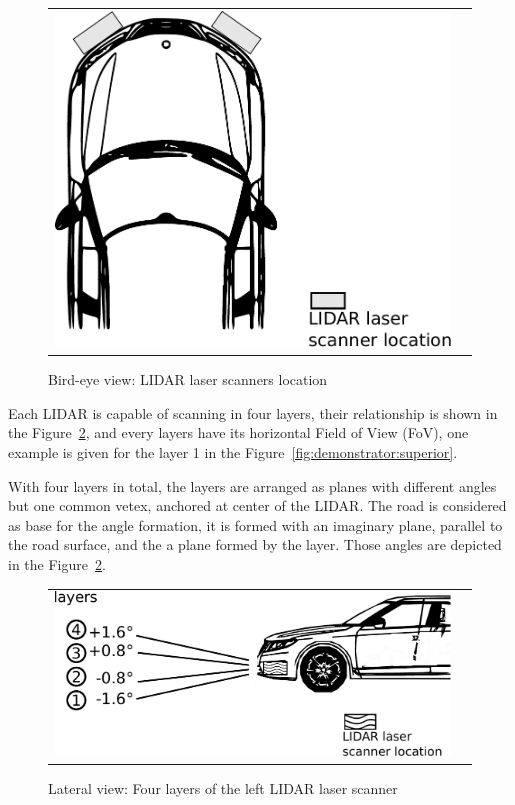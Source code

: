 \begin{figure}[h]
   \centering
     \begin{tabular}{lr}
       \includegraphics[scale=0.3]{img/fig:demonstrator:birdeye}
     \end{tabular}
   \caption{Bird-eye view: LIDAR laser scanners location}
   \label{fig:demonstrator:birdeye}
\end{figure}

Each LIDAR is capable of scanning in four layers, their relationship is shown  in the Figure~\ref{fig:demonstrator:lateral}, and every layers have its horizontal Field of View (FoV), one example is given for the layer 1 in the Figure~\ref{fig:demonstrator:superior}.

With four layers in total, the layers are arranged as planes with different angles but one common vetex, anchored at center of the LIDAR. The road is considered as base for the angle formation, it is formed with an imaginary plane, parallel to the road surface, and the a plane formed by the layer. Those angles are depicted in the Figure~\ref{fig:demonstrator:lateral}.

\begin{figure}[h]
   \centering
     \begin{tabular}{lr}
       \includegraphics[scale=0.5]{img/fig:demonstrator:lateral}
     \end{tabular}
   \caption{Lateral view: Four layers of the left LIDAR laser scanner}
   \label{fig:demonstrator:lateral}
\end{figure}

